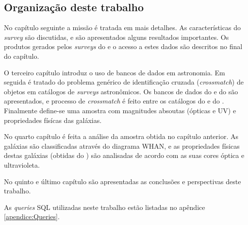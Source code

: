 \subsection{Organização deste trabalho}

No capítulo seguinte a missão \galex é tratada em mais detalhes. As
características do {\em survey} são discutidas, e são apresentados alguns
resultados importantes. Os produtos gerados pelos {\em surveys} do \galex e o
acesso a estes dados são descritos no final do capítulo.

O terceiro capítulo introduz o uso de bancos de dados em astronomia. Em seguida
é tratado do problema genérico de identificação cruzada ({\em crossmatch}) de
objetos em catálogos de {\em surveys} astronômicos. Os bancos de dados do \SDSS
e do \starlight são apresentados, e processo de {\em crossmatch} é feito entre
os catálogos do \SDSS e do \galex. Finalmente define-se uma amostra com
magnitudes absoutas (ópticas e UV) e propriedades físícas das galáxias.

No quarto capítulo é feita a análise da amostra obtida no capítulo anterior. As
galáxias são classificadas através do diagrama WHAN, e as propriedades físicas
destas galáxias (obtidas do \starlight) são analisadas de acordo com as suas
cores óptica e ultravioleta.

No quinto e último capítulo são apresentadas as conclusões e perspectivas deste
trabalho.

As {\em queries} SQL utilizadas neste trabalho estão listadas no apêndice
\ref{apendice:Queries}.

